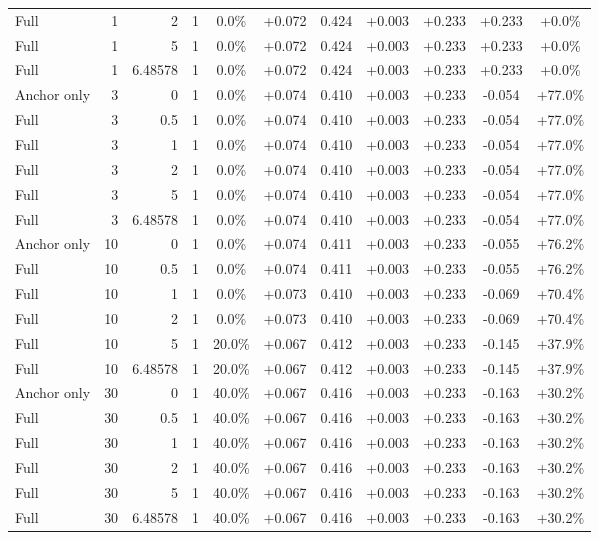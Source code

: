 \begin{table}[htbp]
\begin{tabular}{lrrrccccccc}
Full & 1 & 2 & 1 & 0.0\% & +0.072 & 0.424 & +0.003 & +0.233 & +0.233 & +0.0\% \\
Full & 1 & 5 & 1 & 0.0\% & +0.072 & 0.424 & +0.003 & +0.233 & +0.233 & +0.0\% \\
Full & 1 & 6.48578 & 1 & 0.0\% & +0.072 & 0.424 & +0.003 & +0.233 & +0.233 & +0.0\% \\
Anchor only & 3 & 0 & 1 & 0.0\% & +0.074 & 0.410 & +0.003 & +0.233 & -0.054 & +77.0\% \\
Full & 3 & 0.5 & 1 & 0.0\% & +0.074 & 0.410 & +0.003 & +0.233 & -0.054 & +77.0\% \\
Full & 3 & 1 & 1 & 0.0\% & +0.074 & 0.410 & +0.003 & +0.233 & -0.054 & +77.0\% \\
Full & 3 & 2 & 1 & 0.0\% & +0.074 & 0.410 & +0.003 & +0.233 & -0.054 & +77.0\% \\
Full & 3 & 5 & 1 & 0.0\% & +0.074 & 0.410 & +0.003 & +0.233 & -0.054 & +77.0\% \\
Full & 3 & 6.48578 & 1 & 0.0\% & +0.074 & 0.410 & +0.003 & +0.233 & -0.054 & +77.0\% \\
Anchor only & 10 & 0 & 1 & 0.0\% & +0.074 & 0.411 & +0.003 & +0.233 & -0.055 & +76.2\% \\
Full & 10 & 0.5 & 1 & 0.0\% & +0.074 & 0.411 & +0.003 & +0.233 & -0.055 & +76.2\% \\
Full & 10 & 1 & 1 & 0.0\% & +0.073 & 0.410 & +0.003 & +0.233 & -0.069 & +70.4\% \\
Full & 10 & 2 & 1 & 0.0\% & +0.073 & 0.410 & +0.003 & +0.233 & -0.069 & +70.4\% \\
Full & 10 & 5 & 1 & 20.0\% & +0.067 & 0.412 & +0.003 & +0.233 & -0.145 & +37.9\% \\
Full & 10 & 6.48578 & 1 & 20.0\% & +0.067 & 0.412 & +0.003 & +0.233 & -0.145 & +37.9\% \\
Anchor only & 30 & 0 & 1 & 40.0\% & +0.067 & 0.416 & +0.003 & +0.233 & -0.163 & +30.2\% \\
Full & 30 & 0.5 & 1 & 40.0\% & +0.067 & 0.416 & +0.003 & +0.233 & -0.163 & +30.2\% \\
Full & 30 & 1 & 1 & 40.0\% & +0.067 & 0.416 & +0.003 & +0.233 & -0.163 & +30.2\% \\
Full & 30 & 2 & 1 & 40.0\% & +0.067 & 0.416 & +0.003 & +0.233 & -0.163 & +30.2\% \\
Full & 30 & 5 & 1 & 40.0\% & +0.067 & 0.416 & +0.003 & +0.233 & -0.163 & +30.2\% \\
Full & 30 & 6.48578 & 1 & 40.0\% & +0.067 & 0.416 & +0.003 & +0.233 & -0.163 & +30.2\% \\

\end{tabular}
\end{table}
